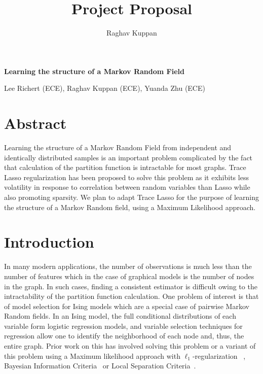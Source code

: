 \documentclass[11pt]{article}
\author{Raghav Kuppan}
\title{Project Proposal}
\begin{document}
\begin{center}
\textbf{\Large Learning the structure of a Markov Random Field}
\end{center}

\begin{center}
Lee Richert (ECE), Raghav Kuppan (ECE), Yuanda Zhu (ECE)
\end{center}



\section{Abstract}
Learning the structure of a Markov Random Field from independent and identically distributed samples is an important problem complicated by the fact that calculation of the partition function is intractable for most graphs. Trace Lasso regularization has been proposed to solve this problem as it exhibits less volatility in response to correlation between random variables than Lasso while also promoting sparsity. We plan to adapt Trace Lasso for the purpose of learning the structure of a Markov Random field, using a Maximum Likelihood approach.

\section{Introduction}
In many modern applications, the number of observations is much less than the number of features which in the case of graphical models is the number of nodes in the graph. In such cases, finding a consistent estimator is difficult owing to the intractability of the partition function calculation. One problem of interest is that of model selection for Ising models which are a special case of pairwise Markov Random fields. In an Ising model, the full conditional distributions of each variable form logistic regression models, and variable selection techniques for regression allow one to identify the neighborhood of each node and, thus, the entire graph. Prior work on this has involved solving this problem or a variant of this problem using a Maximum likelihood approach with $\ell_1$-regularization ~\cite{ravikumar2010high}, Bayesian Information Criteria~\cite{barber2015high} or Local Separation Criteria~\cite{anandkumar2012high}.\\
\end{document}
